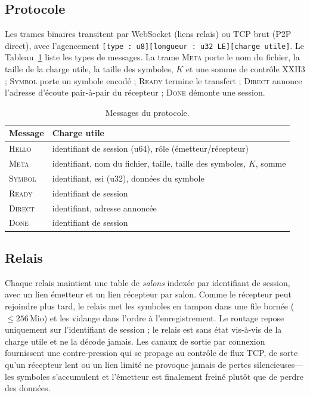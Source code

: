 \documentclass[conference]{IEEEtran}
\begin{document}
\subsection{Protocole}
Les trames binaires transitent par WebSocket (liens relais) ou TCP brut (P2P
direct), avec l'agencement
\texttt{[type : u8][longueur : u32 LE][charge utile]}. Le
Tableau~\ref{tab:protocol} liste les types de messages. La trame \textsc{Meta}
porte le nom du fichier, la taille de la charge utile, la taille des symboles,
$K$ et une somme de contrôle XXH3 ; \textsc{Symbol} porte un symbole encodé ;
\textsc{Ready} termine le transfert ; \textsc{Direct} annonce l'adresse
d'écoute pair-à-pair du récepteur ; \textsc{Done} démonte une session.

\begin{table}[!t]
\centering
\caption{Messages du protocole.}
\label{tab:protocol}
\begin{tabular}{@{}lp{}@{}}
\toprule
Message & Charge utile \\
\midrule
\textsc{Hello} & identifiant de session (u64), rôle (émetteur/récepteur) \\
\textsc{Meta} & identifiant, nom du fichier, taille, taille des symboles, $K$, somme \\
\textsc{Symbol} & identifiant, esi (u32), données du symbole \\
\textsc{Ready} & identifiant de session \\
\textsc{Direct} & identifiant, adresse annoncée \\
\textsc{Done} & identifiant de session \\
\bottomrule
\end{tabular}
\end{table}

\subsection{Relais}
Chaque relais maintient une table de \emph{salons} indexée par identifiant de
session, avec un lien émetteur et un lien récepteur par salon. Comme le
récepteur peut rejoindre plus tard, le relais met les symboles en tampon dans
une file bornée ($\le 256$\,Mio) et les vidange dans l'ordre à l'enregistrement.
Le routage repose uniquement sur l'identifiant de session ; le relais est
sans état vis-à-vis de la charge utile et ne la décode jamais. Les canaux de
sortie par connexion fournissent une contre-pression qui se propage au contrôle
de flux TCP, de sorte qu'un récepteur lent ou un lien limité ne provoque jamais
de pertes silencieuses---les symboles s'accumulent et l'émetteur est
finalement freiné plutôt que de perdre des données.
\end{document}
